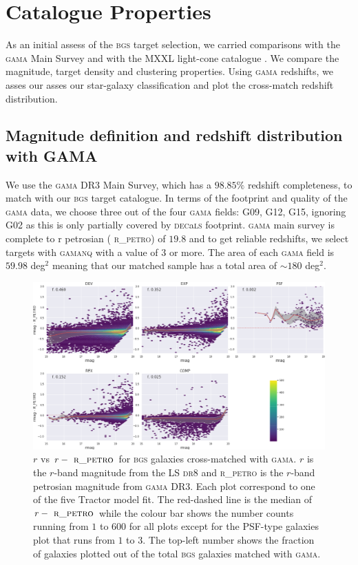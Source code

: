 \documentclass[fleqn,usenatbib]{mnras}
\newcommand{\BGS}{\textsc{bgs}\xspace}
\newcommand{\DECaLS}{\textsc{dec}a\textsc{ls}\xspace}
\newcommand{\DReight}{\textsc{dr8}\xspace}
\newcommand{\GAMA}{\textsc{gama}\xspace}
\newcommand{\NQ}{\textsc{nq}\xspace}
\newcommand{\RPETRO}{{\textsc{ r\_petro}}\xspace}
\newcommand{\TRACTOR}{\textsc{T}ractor\xspace}
\begin{document}
\section{Catalogue Properties}
\label{sec:cat_properties}
As an initial assess of the \BGS target selection, we carried comparisons with the \GAMA Main Survey \citep{10.1093/mnras/stx3042} and with the MXXL light-cone catalogue \citep{Smith:2017tzz}. We compare the magnitude, target density and clustering properties. Using \GAMA redshifts, we asses our asses our star-galaxy classification and plot the cross-match redshift distribution. 

\subsection{Magnitude definition and redshift distribution with GAMA}

We use the \GAMA DR3 Main Survey, which has a $98.85 \%$ redshift completeness, to match with our \BGS target catalogue. In terms of the footprint and quality of the \GAMA data, we choose three out of the four \GAMA fields: G09, G12, G15, ignoring G02 as this is only partially covered by \DECaLS footprint. \GAMA main survey is complete to r petrosian (\RPETRO) of $19.8$ and to get reliable redshifts, we select targets with \GAMA \NQ with a value of $3$ or more. The area of each \GAMA field is $59.98$ deg$^2$ meaning that our matched sample has a total area of $\sim 180$ deg$^2$.

\begin{figure}
	\includegraphics[width=17cm]{images/bgs_gama_mag_diff}
    \caption{ $r$ vs $r-\RPETRO$ for \BGS galaxies cross-matched with \GAMA. $r$ is the $r$-band magnitude from the LS \DReight and \RPETRO is the $r$-band petrosian magnitude from \GAMA DR3. Each plot correspond to one of the five \TRACTOR model fit. The red-dashed line is the median of $r-\RPETRO$ while the colour bar shows the number counts running from $1$ to $600$ for all plots except for the PSF-type galaxies plot that runs from $1$ to $3$. The top-left number shows the fraction of galaxies plotted out of the total \BGS galaxies matched with \GAMA.}
    \label{fig:bgs_gama_magdiff}
\end{figure}
\end{document}
